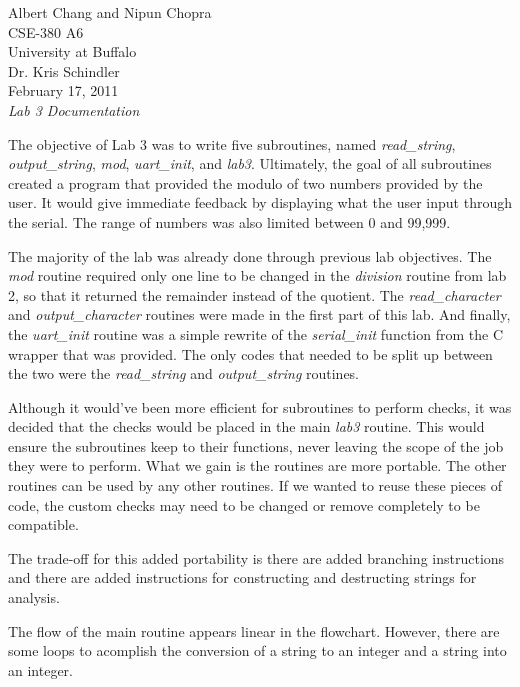 \documentclass[letterpaper,10pt]{article}
\begin{document}
    Albert Chang and Nipun Chopra\\
    CSE-380 A6\\
    University at Buffalo\\
    Dr. Kris Schindler\\
    February 17, 2011\\
    \textit{Lab 3 Documentation}

    The objective of Lab 3 was to write five subroutines, named
    \textit{read\_string}, \textit{output\_string}, \textit{mod},
    \textit{uart\_init}, and \textit{lab3}. Ultimately, the goal of all
    subroutines created a program that provided the modulo of two numbers
    provided by the user. It would give immediate feedback by displaying what
    the user input through the serial. The range of numbers was also limited
    between 0 and 99,999.

    The majority of the lab was already done through previous lab objectives.
    The \textit{mod} routine required only one line to be changed in the
    \textit{division} routine from lab 2, so that it returned the remainder
    instead of the quotient. The \textit{read\_character} and
    \textit{output\_character} routines were made in the first part of this lab.
    And finally, the \textit{uart\_init} routine was a simple rewrite of the
    \textit{serial\_init} function from the C wrapper that was provided. The
    only codes that needed to be split up between the two were the
    \textit{read\_string} and \textit{output\_string} routines.

    Although it would've been more efficient for subroutines to perform checks,
    it was decided that  the checks would be placed in the main \textit{lab3}
    routine. This would ensure the subroutines keep to their functions, never
    leaving the scope of the job they were to perform. What we gain is the
    routines are more portable. The other routines can be used by any other
    routines. If we wanted to reuse these pieces of code, the custom checks may
    need to be changed or remove completely to be compatible.
    
    The trade-off for this added portability is there are added branching
    instructions and there are added instructions for constructing and
    destructing strings for analysis.

    The flow of the main routine appears linear in the flowchart. However,
    there are some loops to acomplish the conversion of a string to an
    integer and a string into an integer.
\end{document}
